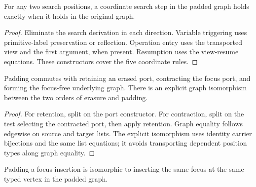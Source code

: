 

\begin{lemma}
For any two search positions, a coordinate search step in the padded graph holds exactly when it holds in the original graph.
\end{lemma}

\begin{proof}
Eliminate the search derivation in each direction. Variable triggering uses primitive-label preservation or reflection. Operation entry uses the transported view and the first argument, when present. Resumption uses the view-resume equations. These constructors cover the five coordinate rules.
\end{proof}



\begin{lemma}
Padding commutes with retaining an erased port, contracting the focus port, and forming the focus-free underlying graph. There is an explicit graph isomorphism between the two orders of erasure and padding.
\end{lemma}

\begin{proof}
For retention, split on the port constructor. For contraction, split on the test selecting the contracted port, then apply retention. Graph equality follows edgewise on source and target lists. The explicit isomorphism uses identity carrier bijections and the same list equations; it avoids transporting dependent position types along graph equality.
\end{proof}






\begin{lemma}
Padding a focus insertion is isomorphic to inserting the same focus at the same typed vertex in the padded graph.
\end{lemma}

